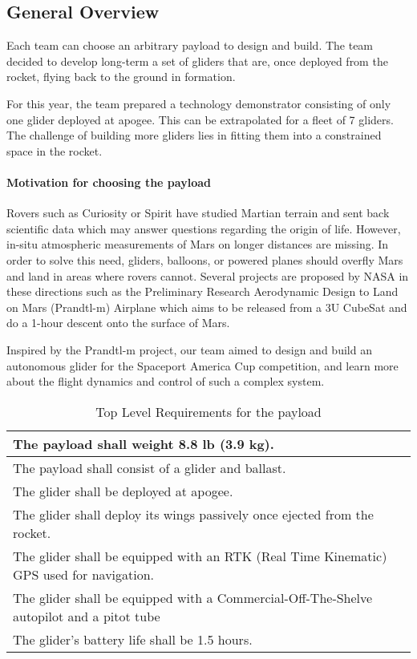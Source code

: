\subsection{General Overview}

Each team can choose an arbitrary payload to design and build. The team decided to develop long-term a set of gliders that are, once deployed from the rocket, flying back to the ground in formation. 


For this year, the team prepared a technology demonstrator consisting of only one glider deployed at apogee. This can be extrapolated for a fleet of 7 gliders. The challenge of building more gliders lies in fitting them into a constrained space in the rocket. 

\paragraph{Motivation for choosing the payload}
\hfill \break
Rovers such as Curiosity or Spirit have studied Martian terrain and sent back scientific data which may answer questions regarding the origin of life. However, in-situ atmospheric measurements of Mars on longer distances are missing. In order to solve this need, gliders, balloons, or powered planes should overfly Mars and land in areas where rovers cannot. Several projects are proposed by NASA in these directions such as the Preliminary Research Aerodynamic Design to Land on Mars (Prandtl-m) Airplane which aims to be released from a 3U CubeSat and do a 1-hour descent onto the surface of Mars.

Inspired by the Prandtl-m project, our team aimed to design and build an autonomous glider for the Spaceport America Cup competition, and learn more about the flight dynamics and control of such a complex system.


\begin{table}[h!]
\centering
\begin{tabular}{|p{}|}
\hline
    The payload shall weight 8.8 lb (3.9 kg). \\ \hline
    The payload shall consist of a glider and ballast.  \\ \hline
    The glider shall be deployed at apogee. \\ \hline
    The glider shall deploy its wings passively once ejected from the rocket. \\ \hline
    The glider shall be equipped with an RTK (Real Time Kinematic) GPS used for navigation. \\ \hline
    The glider shall be equipped with a Commercial-Off-The-Shelve autopilot and a pitot tube \\ \hline
    The glider's battery life shall be 1.5 hours. \\ \hline
\end{tabular}
\caption{Top Level Requirements for the payload}
\label{table:se_topLevelR}
\end{table}



